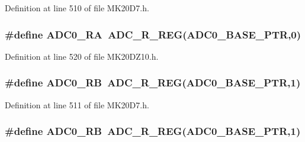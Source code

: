 Definition at line 510 of file M\+K20\+D7.\+h.

\subsubsection[{\texorpdfstring{A\+D\+C0\+\_\+\+RA}{ADC0_RA}}]{\setlength{\rightskip}{0pt plus 5cm}\#define A\+D\+C0\+\_\+\+RA~{\bf A\+D\+C\+\_\+\+R\+\_\+\+R\+EG}({\bf A\+D\+C0\+\_\+\+B\+A\+S\+E\+\_\+\+P\+TR},0)}\hypertarget{group___a_d_c___register___accessor___macros_ga75de47a15ded5bfdd1e17fb6a2b430d5}{}\label{group___a_d_c___register___accessor___macros_ga75de47a15ded5bfdd1e17fb6a2b430d5}


Definition at line 520 of file M\+K20\+D\+Z10.\+h.

\subsubsection[{\texorpdfstring{A\+D\+C0\+\_\+\+RB}{ADC0_RB}}]{\setlength{\rightskip}{0pt plus 5cm}\#define A\+D\+C0\+\_\+\+RB~{\bf A\+D\+C\+\_\+\+R\+\_\+\+R\+EG}({\bf A\+D\+C0\+\_\+\+B\+A\+S\+E\+\_\+\+P\+TR},1)}\hypertarget{group___a_d_c___register___accessor___macros_ga706ac593b7c7142418e9aaecf7484a6b}{}\label{group___a_d_c___register___accessor___macros_ga706ac593b7c7142418e9aaecf7484a6b}


Definition at line 511 of file M\+K20\+D7.\+h.

\subsubsection[{\texorpdfstring{A\+D\+C0\+\_\+\+RB}{ADC0_RB}}]{\setlength{\rightskip}{0pt plus 5cm}\#define A\+D\+C0\+\_\+\+RB~{\bf A\+D\+C\+\_\+\+R\+\_\+\+R\+EG}({\bf A\+D\+C0\+\_\+\+B\+A\+S\+E\+\_\+\+P\+TR},1)}\hypertarget{group___a_d_c___register___accessor___macros_ga706ac593b7c7142418e9aaecf7484a6b}{}\label{group___a_d_c___register___accessor___macros_ga706ac593b7c7142418e9aaecf7484a6b}


